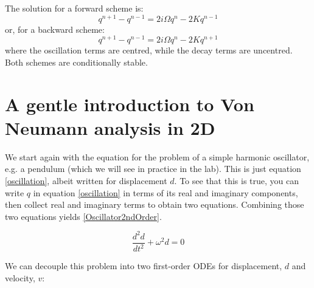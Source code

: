 The solution for a forward scheme is:
\begin{equation}
	q^{n+1} -q^{n-1}= 2i\Omega q^n - 2K q^{n-1}
	\label{oscill-decay-solution-forward}
\end{equation}
or, for a backward scheme:
\begin{equation}
	q^{n+1} -q^{n-1}= 2i\Omega q^n - 2K q^{n+1}
	\label{oscill-decay-solution-forward}
\end{equation}
where the oscillation terms are centred, while the decay terms are uncentred.
Both schemes are conditionally stable.

\section{A gentle introduction to Von Neumann analysis in 2D}

We start again with the equation for the problem of a simple harmonic oscillator, e.g. a pendulum (which we will see in practice in the lab). This is just equation \ref{oscillation}, albeit written for displacement $d$. To see that this is true, you can write $q$ in equation \ref{oscillation} in terms of its real and imaginary components, then collect real and imaginary terms to obtain two equations. Combining those two equations yields \ref{Oscillator2ndOrder}.

\begin{equation}
	\frac{d^2 d}{d t^2}+\omega^2 d=0
	\label{Oscillator2ndOrder}
\end{equation}

We can decouple this problem into two first-order ODEs for displacement, $d$ and velocity, $v$:


